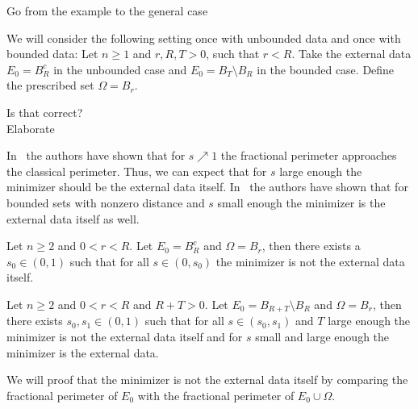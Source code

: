 \begin{TODO}
	Go from the example to the general case
\end{TODO}

We will consider the following setting once with unbounded data and once with bounded
data: Let \( n \geq 1 \) and \( r, R, T > 0 \), such that \( r < R \). Take the external
data \( E_0 = B_R^c \) in the unbounded case and \( E_0 = B_T \setminus B_R
\) in the bounded case. Define the prescribed set \( \Omega = B_r \). \\

\begin{CHECK}
	Is that correct?\\
	Elaborate
\end{CHECK}

In~\cite{Caffarelli2011} the authors have shown that for \( s \nearrow 1 \) the fractional
perimeter approaches the classical perimeter. Thus, we can expect that for \( s \) large
enough the minimizer should be the external data itself. In~\cite{dipierro2012asymptotics}
the authors have shown that for bounded sets with nonzero distance and \( s \) small
enough the minimizer is the external data itself as well. \\

\begin{theorem}
	\label{thm:201}
	Let \( n \geq 2 \) and \( 0 < r < R \). Let \( E_0 = B_R^c \) and \( \Omega =
	B_r \), then there exists a \( s_0 \in (0, 1) \) such that for all \( s \in (0,
	s_0) \) the minimizer is not the external data itself.
\end{theorem}

\begin{theorem}
	\label{thm:202}
	Let \( n \geq 2 \) and \( 0 < r < R \) and \( R+T > 0 \). Let \( E_0 = B_{R+T}  \setminus
	B_R \) and \( \Omega = B_r \), then there exists \( s_0, s_1 \in (0, 1) \)
	such that for all \( s \in (s_0, s_1) \) and \( T \) large enough the minimizer is not
	the external data itself and for \( s \) small and large enough the minimizer is the
	external data.
\end{theorem}

We will proof that the minimizer is not the external data itself by comparing the
fractional perimeter of \( E_0 \) with the fractional perimeter of \( E_0 \cup \Omega \).

